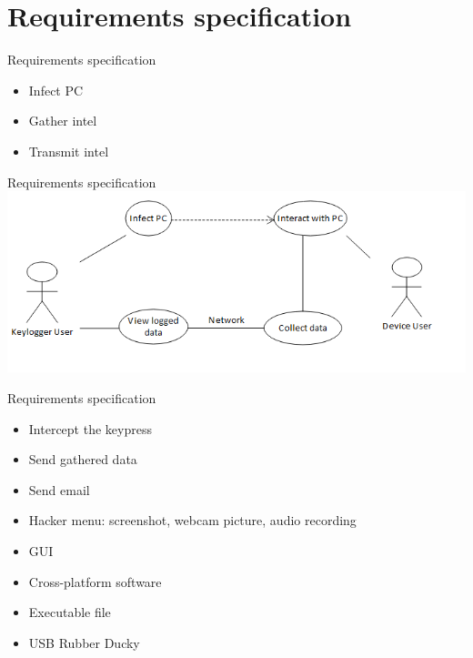 \documentclass{beamer}
\begin{document}
\section{Requirements specification}
\begin{frame}{Requirements specification}
\begin{itemize}
	\item Infect PC
	\item Gather intel
	\item Transmit intel
\end{itemize}
\end{frame}

\begin{frame}[t]{Requirements specification}
\vspace{2.5em}
\includegraphics[scale=0.62]{../images/general keylogger}
\end{frame}

\begin{frame}{Requirements specification}
\begin{itemize}
	\item Intercept the keypress
	\item Send gathered data
	\item Send email
	\item Hacker menu: screenshot, webcam picture, audio recording
	\item GUI
	\item Cross-platform software
	\item Executable file
	\item USB Rubber Ducky
\end{itemize}
\end{frame}
\end{document}
